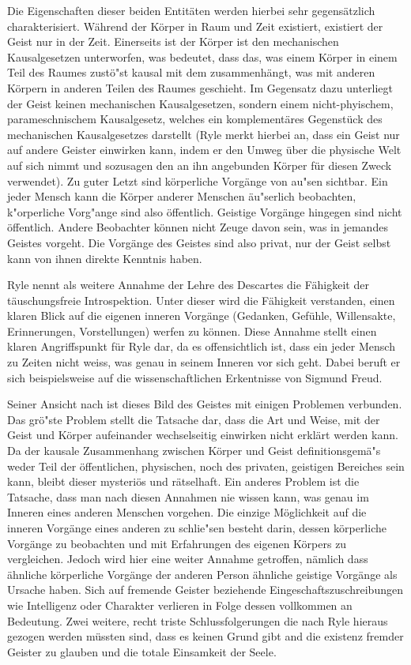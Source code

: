 \documentclass[a4paper]{article}
\begin{document}
Die Eigenschaften dieser beiden \glqq Entitäten\grqq{} werden hierbei sehr gegensätzlich charakterisiert. Während der Körper in Raum und Zeit existiert, existiert der Geist nur in der Zeit. Einerseits ist der Körper ist den mechanischen Kausalgesetzen unterworfen, was bedeutet, dass das, was einem Körper in einem Teil des Raumes zustö"st kausal mit dem zusammenhängt, was mit anderen Körpern in anderen Teilen des Raumes geschieht. Im Gegensatz dazu unterliegt der Geist keinen mechanischen Kausalgesetzen, sondern einem nicht-phyischem, parameschnischem Kausalgesetz, welches ein komplementäres Gegenstück des mechanischen Kausalgesetzes darstellt (Ryle merkt hierbei an, dass ein Geist nur auf andere Geister einwirken kann, indem er den \glqq Umweg\grqq{} über die physische Welt auf sich nimmt und sozusagen den an ihn angebunden Körper für diesen Zweck verwendet). Zu guter Letzt sind körperliche Vorgänge von au"sen sichtbar. Ein jeder Mensch kann die Körper anderer Menschen äu"serlich beobachten, k"orperliche Vorg"ange sind also öffentlich. Geistige Vorgänge hingegen sind nicht öffentlich. Andere Beobachter können nicht Zeuge davon sein, was in jemandes Geistes vorgeht. Die Vorgänge des Geistes sind also privat, nur der Geist selbst kann von ihnen direkte Kenntnis haben.

Ryle nennt als weitere Annahme der Lehre des Descartes die Fähigkeit der täuschungsfreie Introspektion. Unter dieser wird die Fähigkeit verstanden, einen klaren Blick auf die eigenen inneren Vorgänge (Gedanken, Gefühle, Willensakte, Erinnerungen, Vorstellungen) werfen zu können. Diese Annahme stellt einen klaren Angriffspunkt für Ryle dar, da es offensichtlich ist, dass ein jeder Mensch zu Zeiten nicht weiss, was genau in seinem Inneren vor sich geht. Dabei beruft er sich beispielsweise auf die wissenschaftlichen Erkentnisse von Sigmund Freud.

Seiner Ansicht nach ist dieses Bild des Geistes mit einigen Problemen verbunden. Das grö"ste Problem stellt die Tatsache dar, dass die Art und Weise, mit der Geist und Körper aufeinander wechselseitig einwirken nicht erklärt werden kann. Da der kausale Zusammenhang zwischen Körper und Geist definitionsgemä"s weder Teil der öffentlichen, physischen, noch des privaten, geistigen Bereiches sein kann, bleibt dieser mysteriös und rätselhaft. Ein anderes Problem ist die Tatsache, dass man nach diesen Annahmen nie wissen kann, was genau im Inneren eines anderen Menschen vorgehen. Die einzige Möglichkeit auf die inneren Vorgänge eines anderen zu schlie"sen besteht darin, dessen körperliche Vorgänge zu beobachten und mit Erfahrungen des eigenen Körpers zu vergleichen. Jedoch wird hier eine weiter Annahme getroffen, nämlich dass ähnliche körperliche Vorgänge der anderen Person ähnliche geistige Vorgänge als Ursache haben. Sich auf fremende Geister beziehende Eingeschaftszuschreibungen wie Intelligenz oder Charakter verlieren in Folge dessen vollkommen an Bedeutung. Zwei weitere, recht triste Schlussfolgerungen die nach Ryle hieraus gezogen werden müssten sind, dass es keinen Grund gibt and die existenz fremder Geister zu glauben und die totale Einsamkeit der Seele.
\end{document}
